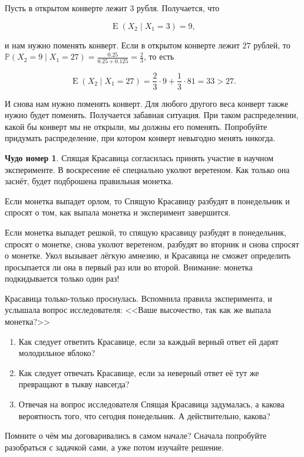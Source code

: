 \documentclass[12pt, a4paper, oneside]{extreport}
\DeclareMathOperator{\E}{\mathop{E}}
\def \mbb{\mathbb}
\def \PP{\mbb{P}}
\theoremstyle{plain}              %
\theoremstyle{definition}         %
\newtheorem{chudo}{Чудо номер}   %
\begin{document}
Пусть в открытом конверте лежит $3$ рубля. Получается, что

\[\E(X_2 \mid X_1 = 3) = 9,\]

и нам нужно поменять конверт. Если в открытом конверте лежит $27$ рублей, то $\PP(X_2 = 9 \mid X_1 = 27) = \frac{0.25}{0.25 + 0.125} = \frac{2}{3}$, то есть

\[ \E(X_2 \mid X_1 = 27) = \frac{2}{3} \cdot 9 + \frac{1}{3} \cdot 81 = 33 > 27.\]

И снова нам нужно поменять конверт. Для любого другого веса конверт также нужно будет поменять. Получается забавная ситуация. При таком распределении, какой бы конверт мы не открыли, мы должны его поменять. Попробуйте придумать распределение, при котором конверт невыгодно менять никогда. 

\begin{chudo}
Спящая Красавица согласилась принять участие в научном эксперименте. В воскресение её специально уколют веретеном. Как только она заснёт, будет подброшена правильная монетка.

Если монетка выпадет орлом, то Спящую Красавицу разбудят в понедельник и спросят о том, как выпала монетка и эксперимент завершится.

Если монетка выпадет решкой, то спящую красавицу разбудят в понедельник, спросят о монетке, снова уколют веретеном, разбудят во вторник и снова спросят о монетке. Укол вызывает лёгкую амнезию, и Красавица не сможет определить просыпается ли она в первый раз или во второй. Внимание: монетка подкидывается только один раз!

Красавица только-только проснулась. Вспомнила правила эксперимента, и услышала вопрос исследователя: <<Ваше высочество, так как же выпала монетка?>>

\begin{enumerate}
\item Как следует ответить Красавице, если за каждый верный ответ ей дарят молодильное яблоко?

\item Как следует отвечать Красавице, если за неверный ответ её тут же превращают в тыкву навсегда?

\item Отвечая на вопрос исследователя Спящая Красавица задумалась, а какова вероятность того, что сегодня понедельник. А действительно, какова?
\end{enumerate}
\end{chudo}

Помните о чём мы договаривались в самом начале? Сначала попробуйте разобраться с задачкой сами, а уже потом изучайте решение. 
\end{document}
